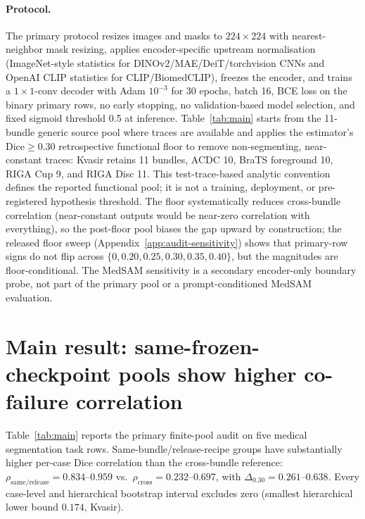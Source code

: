 \documentclass{article}
\begin{document}
\paragraph{Protocol.} The primary protocol resizes images and masks to $224{\times}224$ with nearest-neighbor mask resizing, applies encoder-specific upstream normalisation (ImageNet-style statistics for DINOv2/MAE/DeiT/torchvision CNNs and OpenAI CLIP statistics for CLIP/BiomedCLIP), freezes the encoder, and trains a $1{\times}1$-conv decoder with Adam $10^{-3}$ for 30 epochs, batch 16, BCE loss on the binary primary rows, no early stopping, no validation-based model selection, and fixed sigmoid threshold 0.5 at inference. Table~\ref{tab:main} starts from the 11-bundle generic source pool where traces are available and applies the estimator's Dice${\geq}0.30$ retrospective functional floor to remove non-segmenting, near-constant traces: Kvasir retains 11 bundles, ACDC 10, BraTS foreground 10, RIGA Cup 9, and RIGA Disc 11. This test-trace-based analytic convention defines the reported functional pool; it is not a training, deployment, or pre-registered hypothesis threshold. The floor systematically reduces cross-bundle correlation (near-constant outputs would be near-zero correlation with everything), so the post-floor pool biases the gap upward by construction; the released floor sweep (Appendix~\ref{app:audit-sensitivity}) shows that primary-row signs do not flip across $\{0, 0.20, 0.25, 0.30, 0.35, 0.40\}$, but the magnitudes are floor-conditional. The MedSAM sensitivity is a secondary encoder-only boundary probe, not part of the primary pool or a prompt-conditioned MedSAM evaluation.

\section{Main result: same-frozen-checkpoint pools show higher co-failure correlation}
\label{sec:main}

Table~\ref{tab:main} reports the primary finite-pool audit on five medical segmentation task rows. Same-bundle/release-recipe groups have substantially higher per-case Dice correlation than the cross-bundle reference: $\rho_{\text{same/release}}=0.834$--$0.959$ vs.\ $\rho_{\text{cross}}=0.232$--$0.697$, with $\Delta_{0.30}=0.261$--$0.638$. Every case-level and hierarchical bootstrap interval excludes zero (smallest hierarchical lower bound $0.174$, Kvasir).
\end{document}
